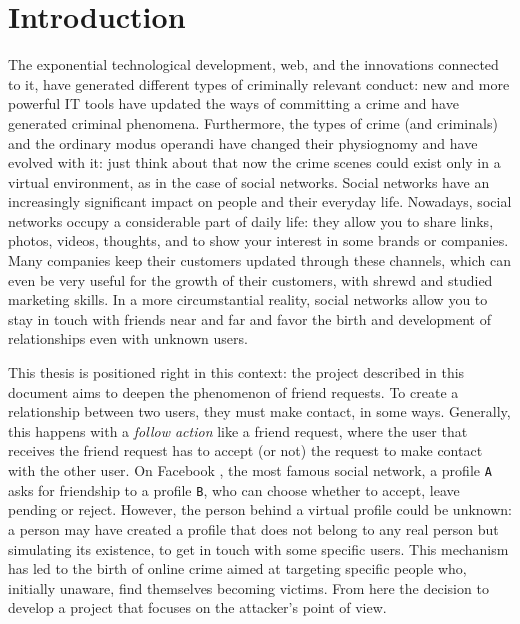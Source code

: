 
\chapter{Introduction}
\label{cap:introduction}
The exponential technological development, web, and the innovations connected to it, have generated different types of criminally relevant conduct: new and more powerful IT tools have updated the ways of committing a crime and have generated criminal phenomena. Furthermore,  the types of crime (and criminals) and the ordinary modus operandi have changed their physiognomy and have evolved with it: just think about that now the crime scenes could exist only in a virtual environment, as in the case of social networks. Social networks have an increasingly significant impact on people and their everyday life. Nowadays, social networks occupy a considerable part of daily life: they allow you to share links, photos, videos, thoughts, and to show your interest in some brands or companies. Many companies keep their customers updated through these channels, which can even be very useful for the growth of their customers, with shrewd and studied marketing skills. In a more circumstantial reality, social networks allow you to stay in touch with friends near and far and favor the birth and development of relationships even with unknown users.
\par \noindent This thesis is positioned right in this context: the project described in this document aims to deepen the phenomenon of friend requests. To create a relationship between two users, they must make contact, in some ways. Generally, this happens with a \textit{follow action} like a friend request, where the user that receives the friend request has to accept (or not) the request to make contact with the other user.
On Facebook \parencite{site:facebook}, the most famous social network, a profile \texttt{A} asks for friendship to a profile \texttt{B}, who can choose whether to accept, leave pending or reject. However, the person behind a virtual profile could be unknown: a person may have created a profile that does not belong to any real person but simulating its existence, to get in touch with some specific users. This mechanism has led to the birth of online crime aimed at targeting specific people who, initially unaware, find themselves becoming victims. From here the decision to develop a project that focuses on the attacker's point of view.
